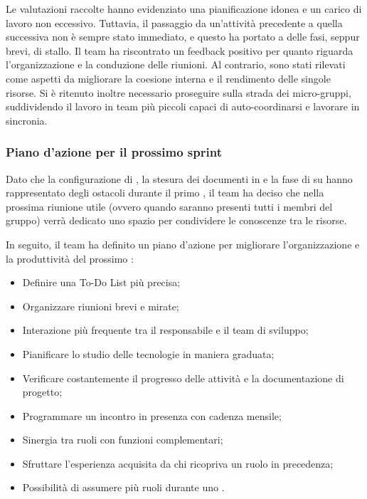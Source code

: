 \vspace{0.5\baselineskip}
\par Le valutazioni raccolte hanno evidenziato una pianificazione idonea e un carico di lavoro non eccessivo. Tuttavia, il passaggio da un'attività precedente a quella successiva non è sempre stato immediato, e questo ha portato a delle fasi, seppur brevi, di stallo. Il team ha riscontrato un feedback positivo per quanto riguarda l'organizzazione e la conduzione delle riunioni. Al contrario, sono stati rilevati come aspetti da migliorare la coesione interna e il rendimento delle singole risorse. Si è ritenuto inoltre necessario proseguire sulla strada dei micro-gruppi, suddividendo il lavoro in team più piccoli capaci di auto-coordinarsi e lavorare in sincronia.

\subsubsection{Piano d'azione per il prossimo sprint}
\par Dato che la configurazione di , la stesura dei documenti in  e la fase di  su  hanno rappresentato degli ostacoli durante il primo , il team ha deciso che nella prossima riunione utile (ovvero quando saranno presenti tutti i membri del gruppo) verrà dedicato uno spazio per condividere le conoscenze tra le risorse.
\par In seguito, il team ha definito un piano d'azione per migliorare l'organizzazione e la produttività del prossimo :
\begin{itemize}
  \item Definire una To-Do List più precisa;
  \item Organizzare riunioni brevi e mirate;
  \item Interazione più frequente tra il responsabile e il team di sviluppo;
  \item Pianificare lo studio delle tecnologie in maniera graduata;
  \item Verificare costantemente il progresso delle attività e la documentazione di progetto;
  \item Programmare un incontro in presenza con cadenza mensile;
  \item Sinergia tra ruoli con funzioni complementari;
  \item Sfruttare l'esperienza acquisita da chi ricopriva un ruolo in precedenza;
  \item Possibilità di assumere più ruoli durante uno .
\end{itemize}

